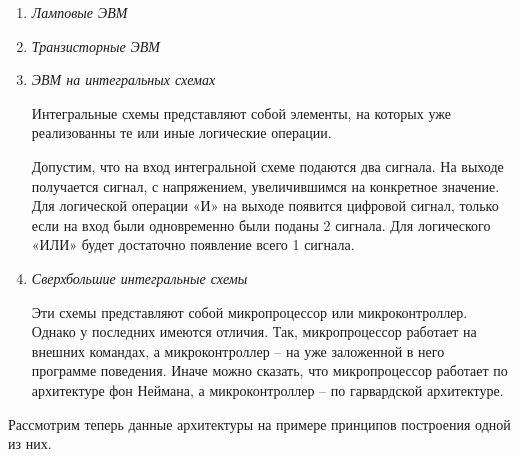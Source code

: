 \begin{enumerate}
	\item \emph{Ламповые ЭВМ}
	
	
	\item \emph{Транзисторные ЭВМ}
	
	
	\item \emph{ЭВМ на интегральных схемах}
	
	Интегральные схемы представляют собой элементы, на которых уже реализованны те или иные логические операции.
	
	\begin{example}{}
		Допустим, что на вход интегральной схеме подаются два сигнала. На выходе получается сигнал, с напряжением, увеличившимся на конкретное значение. Для логической операции «И» на выходе появится цифровой сигнал, только если на вход были одновременно были поданы 2 сигнала. Для логического «ИЛИ» будет достаточно появление всего 1 сигнала.
	\end{example}
		
	\item \emph{Сверхбольшие интегральные схемы}
	
	Эти схемы представляют собой микропроцессор или микроконтроллер. Однако у последних имеются отличия. Так, микропроцессор работает на внешних командах, а микроконтроллер -- на уже заложенной в него программе поведения. Иначе можно сказать, что микропроцессор работает по архитектуре фон Неймана, а микроконтроллер -- по гарвардской архитектуре. 
	
\end{enumerate}	
		
Рассмотрим теперь данные архитектуры на примере принципов построения одной из них.


